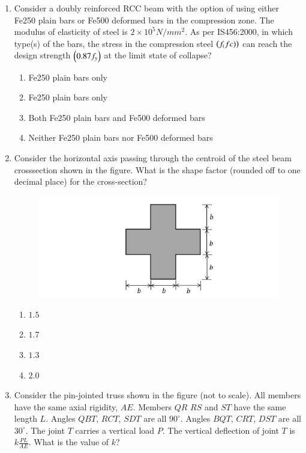 \documentclass[journal,12pt,onecolumn]{IEEEtran}
\theoremstyle{remark}
\begin{document}
\begin{enumerate}
\item Consider a doubly reinforced RCC beam with the option of using either Fe250 plain bars or Fe500 deformed bars in the compression zone. The modulus of elasticity of steel is $2 \times 10^5 N/mm^2$. As per IS456:2000, in which type(s) of the bars, the stress in the compression steel $\left(f_(fc)\right)$ can reach the design strength $\left(0.87f_y\right)$ at the limit state of collapse?

\hfill{}
\begin{enumerate}
\item Fe250 plain bars only
\item Fe250 plain bars only
\item Both Fe250 plain bars and Fe500 deformed bars
\item Neither Fe250 plain bars nor Fe500 deformed bars
\end{enumerate}

\item Consider the horizontal axis passing through the centroid of the steel beam crosssection shown in the figure. What is the shape factor (rounded off to one decimal place) for the cross-section?

\hfill{}
\begin{figure}[H]
\centering
\includegraphics[width=0.5\linewidth]{figs/q38.png}
\caption*{}
\label{fig:Q.38}
\end{figure}
\begin{enumerate}
\item $1.5$
\item $1.7$
\item $1.3$
\item $2.0$
\end{enumerate}

\item Consider the pin-jointed truss shown in the figure (not to scale). All members have the same axial rigidity, $AE$. Members $QR$
$RS$ and $ST$ have the same length $L$. Angles $QBT$, $RCT$, $SDT$ are all $90^\circ$. Angles $BQT$, $CRT$, $DST$ are all $30^\circ$. The joint $T$ carries a vertical load $P$. The vertical deflection of joint $T$ is $k\frac{PL}{AE}$. What is the value of $k$?


\end{enumerate}
\end{document}
